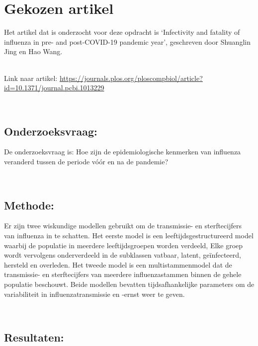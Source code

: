 \documentclass[
]{book}
\begin{document}
\section{Gekozen artikel}\label{gekozen-artikel}

Het artikel dat is onderzocht voor deze opdracht is `Infectivity and fatality of influenza in pre- and post-COVID-19 pandemic year', geschreven door Shuanglin Jing en Hao Wang.\\
\strut \\
Link naar artikel:
\url{https://journals.plos.org/ploscompbiol/article?id=10.1371/journal.pcbi.1013229}\\
\strut \\

\subsection{Onderzoeksvraag:}\label{onderzoeksvraag}

De onderzoeksvraag is: Hoe zijn de epidemiologische kenmerken van influenza veranderd tussen de periode vóór en na de pandemie?\\
\strut \\

\subsection{Methode:}\label{methode}

Er zijn twee wiskundige modellen gebruikt om de transmissie- en sterftecijfers van influenza in te schatten. Het eerste model is een leeftijdsgestructureerd model waarbij de populatie in meerdere leeftijdsgroepen worden verdeeld, Elke groep wordt vervolgens onderverdeeld in de subklassen vatbaar, latent, geïnfecteerd, hersteld en overleden. Het tweede model is een multistammenmodel dat de transmissie- en sterftecijfers van meerdere influenzastammen binnen de gehele populatie beschouwt. Beide modellen bevatten tijdsafhankelijke parameters om de variabiliteit in influenzatransmissie en -ernst weer te geven.\\
\strut \\

\subsection{Resultaten:}\label{resultaten}
\end{document}
